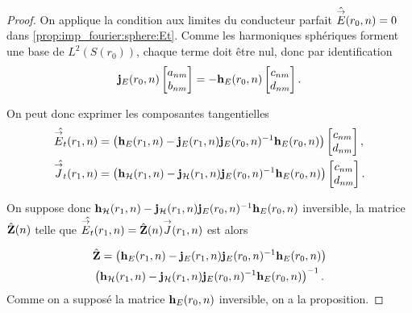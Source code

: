     \begin{proof}
        On applique la condition aux limites du conducteur parfait \(\hat {{\overset{\rightarrow}{E}}}(r_0,n) = 0\) dans \eqref{prop:imp_fourier:sphere:Et}.
        Comme les harmoniques sphériques forment une base de \(L^2(S(r_0))\), chaque terme doit être nul, donc par identification
        \begin{equation*}
            \mathbf{j}_{E}(r_0,n)
            \begin{bmatrix}
                a_{nm}
                \\
                b_{nm}
            \end{bmatrix}
            =-\mathbf{h}_{E}(r_0,n)
            \begin{bmatrix}
                c_{nm}
                \\
                d_{nm}
            \end{bmatrix}.
        \end{equation*}

        On peut donc exprimer les composantes tangentielles%
        \begin{align*}
            \hat{{\overset{\rightarrow}{E}}_t}(r_1,n) &=
            \left(\mathbf{h}_{E}(r_1,n) - \mathbf{j}_{E}(r_1,n)\mathbf{j}_{E}(r_0,n)^{-1}\mathbf{h}_{E}(r_0,n)\right)
            \begin{bmatrix}
                c_{nm}
                \\
                d_{nm}
            \end{bmatrix},
            \\
            \hat{{\overset{\rightarrow}{J}}_t}(r_1,n) &=
            \left(\mathbf{h}_{\mathcal{H}}(r_1,n) - \mathbf{j}_{\mathcal{H}}(r_1,n)\mathbf{j}_{E}(r_0,n)^{-1}\mathbf{h}_{E}(r_0,n) \right)
            \begin{bmatrix}
                c_{nm}
                \\
                d_{nm}
            \end{bmatrix}.
        \end{align*}

        On suppose donc \(\mathbf{h}_{\mathcal{H}}(r_1,n) - \mathbf{j}_{\mathcal{H}}(r_1,n)\mathbf{j}_{E}(r_0,n)^{-1}\mathbf{h}_{E}(r_0,n)\) inversible, la matrice \(\hat{\mathbf{Z}}(n)\) telle que \(\hat{{\overset{\rightarrow}{E}}_t}(r_1,n) = \hat{\mathbf{Z}}(n) {\overset{\rightarrow}{J}}(r_1,n)\) est alors

        \begin{multline*}
            \hat {\mathbf{Z}} =
            \left(\mathbf{h}_{E}(r_1,n) - \mathbf{j}_{E}(r_1,n)\mathbf{j}_{E}(r_0,n)^{-1}\mathbf{h}_{E}(r_0,n)\right)
            \\
            \left(\mathbf{h}_{\mathcal{H}}(r_1,n) - \mathbf{j}_{\mathcal{H}}(r_1,n)\mathbf{j}_{E}(r_0,n)^{-1}\mathbf{h}_{E}(r_0,n)\right)^{-1}.
        \end{multline*}
        Comme on a supposé la matrice \(\mathbf{h}_E(r_0,n)\) inversible, on a la proposition.

    \end{proof}


